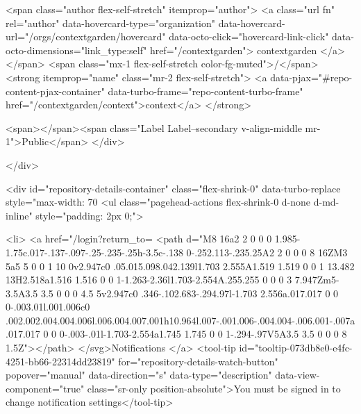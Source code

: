     <span class="author flex-self-stretch" itemprop="author">
      <a class="url fn" rel="author" data-hovercard-type="organization" data-hovercard-url="/orgs/contextgarden/hovercard" data-octo-click="hovercard-link-click" data-octo-dimensions="link_type:self" href="/contextgarden">
        contextgarden
</a>    </span>
    <span class="mx-1 flex-self-stretch color-fg-muted">/</span>
    <strong itemprop="name" class="mr-2 flex-self-stretch">
      <a data-pjax="#repo-content-pjax-container" data-turbo-frame="repo-content-turbo-frame" href="/contextgarden/context">context</a>
    </strong>

    <span></span><span class="Label Label--secondary v-align-middle mr-1">Public</span>
  </div>


        </div>

        <div id="repository-details-container" class="flex-shrink-0" data-turbo-replace style="max-width: 70%
            <ul class="pagehead-actions flex-shrink-0 d-none d-md-inline" style="padding: 2px 0;">
    
      

  <li>
            <a href="/login?return_to=%
    <path d="M8 16a2 2 0 0 0 1.985-1.75c.017-.137-.097-.25-.235-.25h-3.5c-.138 0-.252.113-.235.25A2 2 0 0 0 8 16ZM3 5a5 5 0 0 1 10 0v2.947c0 .05.015.098.042.139l1.703 2.555A1.519 1.519 0 0 1 13.482 13H2.518a1.516 1.516 0 0 1-1.263-2.36l1.703-2.554A.255.255 0 0 0 3 7.947Zm5-3.5A3.5 3.5 0 0 0 4.5 5v2.947c0 .346-.102.683-.294.97l-1.703 2.556a.017.017 0 0 0-.003.01l.001.006c0 .002.002.004.004.006l.006.004.007.001h10.964l.007-.001.006-.004.004-.006.001-.007a.017.017 0 0 0-.003-.01l-1.703-2.554a1.745 1.745 0 0 1-.294-.97V5A3.5 3.5 0 0 0 8 1.5Z"></path>
</svg>Notifications
</a>    <tool-tip id="tooltip-073db8e0-e4fc-4251-bb66-22314dd23819" for="repository-details-watch-button" popover="manual" data-direction="s" data-type="description" data-view-component="true" class="sr-only position-absolute">You must be signed in to change notification settings</tool-tip>

